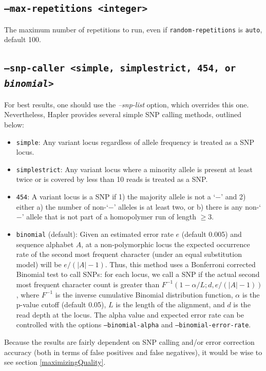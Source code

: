 \documentclass[11pt]{llncs}
\begin{document}
\subsection{\texttt{--max-repetitions <integer>}}

The maximum number of repetitions to run, even if \texttt{random-repetitions} is \texttt{auto}, default 100.


\subsection{\texttt{--snp-caller <simple, simplestrict, 454, or \emph{binomial}>}}

For best results, one should use the \emph{--snp-list} option, which overrides this one. Nevertheless, Hapler provides several simple SNP 
calling methods, outlined below:

\begin{itemize}
	\item \texttt{simple}: Any variant locus regardless of allele frequency is treated as a SNP locus.
	\item \texttt{simplestrict}: Any variant locus where a minority allele is present at least twice or is covered by less than 10 reads is treated as a SNP.
	\item \texttt{454}: A variant locus is a SNP if 1) the majority allele is not a `$-$'
	and 2) either a) the number of non-`$-$' alleles is at least two, or
	b) there is any non-`$-$' allele that is not part of a homopolymer run
	of length $\geq 3$.
	\item \texttt{binomial} (default): Given an estimated error rate $e$ (default 0.005) and sequence alphabet $A$, at a non-polymorphic locus the
   expected occurrence rate of the second most frequent character (under an equal substitution model) will be $e/(|A|-1)$. Thus, this method
   uses a Bonferroni corrected Binomial test to call SNPs: for each locus, we call a SNP if the actual second most frequent character count is
   greater than $F^{-1}\left(1-\alpha/L; d, e/(|A|-1) \right)$, where $F^{-1}$ is the inverse cumulative Binomial distribution function, 
   $\alpha$ is the p-value cutoff (default 0.05), $L$ is the length of the alignment, and $d$ is the read depth at the locus. The alpha value 
   and expected error rate can be controlled with the options \texttt{--binomial-alpha} and \texttt{--binomial-error-rate}.
\end{itemize}


Because the results are fairly dependent on SNP calling and/or error correction accuracy (both in terms of false positives and false negatives), it would
be wise to see section \ref{maximizingQuality}.
\end{document}
